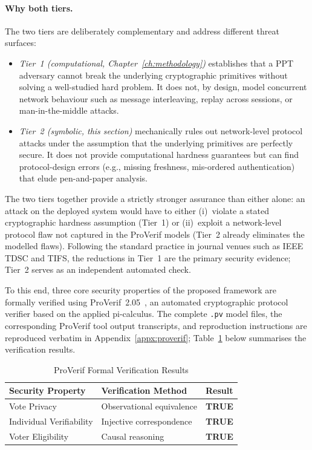 \paragraph{Why both tiers.} The two tiers are deliberately complementary and address different threat surfaces:
\begin{itemize}
    \item \emph{Tier~1 (computational, Chapter~\ref{ch:methodology})} establishes that a PPT adversary cannot break the underlying cryptographic primitives without solving a well-studied hard problem. It does not, by design, model concurrent network behaviour such as message interleaving, replay across sessions, or man-in-the-middle attacks.
    \item \emph{Tier~2 (symbolic, this section)} mechanically rules out network-level protocol attacks under the assumption that the underlying primitives are perfectly secure. It does not provide computational hardness guarantees but can find protocol-design errors (e.g., missing freshness, mis-ordered authentication) that elude pen-and-paper analysis.
\end{itemize}
The two tiers together provide a strictly stronger assurance than either alone: an attack on the deployed system would have to either (i)~violate a stated cryptographic hardness assumption (Tier~1) or (ii)~exploit a network-level protocol flaw not captured in the ProVerif models (Tier~2 already eliminates the modelled flaws). Following the standard practice in journal venues such as IEEE TDSC and TIFS, the reductions in Tier~1 are the primary security evidence; Tier~2 serves as an independent automated check.

To this end, three core security properties of the proposed framework are formally verified using ProVerif~2.05~\cite{blanchet2016}, an automated cryptographic protocol verifier based on the applied pi-calculus. The complete \texttt{.pv} model files, the corresponding ProVerif tool output transcripts, and reproduction instructions are reproduced verbatim in Appendix~\ref{appx:proverif}; Table~\ref{tab:proverif} below summarises the verification results.

\begin{table}[H]
\centering
\caption{ProVerif Formal Verification Results}
\label{tab:proverif}
\begin{tabular}{|l|l|l|}
\hline
\textbf{Security Property} & \textbf{Verification Method} & \textbf{Result} \\
\hline
Vote Privacy & Observational equivalence & \textbf{TRUE} \\
\hline
Individual Verifiability & Injective correspondence & \textbf{TRUE} \\
\hline
Voter Eligibility & Causal reasoning & \textbf{TRUE} \\
\hline
\end{tabular}
\end{table}

